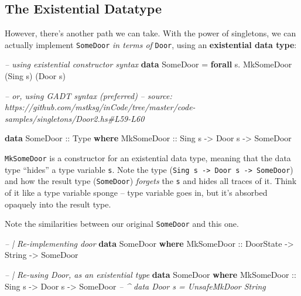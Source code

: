 \documentclass[]{article}
\newenvironment{Shaded}{}{}
\newcommand{\CommentTok}[1]{\textcolor[rgb]{0.38,0.63,0.69}{\textit{#1}}}
\newcommand{\DataTypeTok}[1]{\textcolor[rgb]{0.56,0.13,0.00}{#1}}
\newcommand{\KeywordTok}[1]{\textcolor[rgb]{0.00,0.44,0.13}{\textbf{#1}}}
\newcommand{\NormalTok}[1]{#1}
\newcommand{\OperatorTok}[1]{\textcolor[rgb]{0.40,0.40,0.40}{#1}}
\newcommand{\OtherTok}[1]{\textcolor[rgb]{0.00,0.44,0.13}{#1}}
\begin{document}
\hypertarget{the-existential-datatype}{%
\subsection{The Existential Datatype}\label{the-existential-datatype}}

However, there's another path we can take. With the power of singletons, we can
actually implement \texttt{SomeDoor} \emph{in terms of} \texttt{Door}, using an
\textbf{existential data type}:

\begin{Shaded}
\begin{Highlighting}[]
\CommentTok{-- using existential constructor syntax}
\KeywordTok{data} \DataTypeTok{SomeDoor} \OtherTok{=} \KeywordTok{forall}\NormalTok{ s}\OperatorTok{.} \DataTypeTok{MkSomeDoor}\NormalTok{ (}\DataTypeTok{Sing}\NormalTok{ s) (}\DataTypeTok{Door}\NormalTok{ s)}

\CommentTok{-- or, using GADT syntax (preferred)}
\CommentTok{-- source: https://github.com/mstksg/inCode/tree/master/code-samples/singletons/Door2.hs#L59-L60}

\KeywordTok{data} \DataTypeTok{SomeDoor}\OtherTok{ ::} \DataTypeTok{Type} \KeywordTok{where}
    \DataTypeTok{MkSomeDoor}\OtherTok{ ::} \DataTypeTok{Sing}\NormalTok{ s }\OtherTok{->} \DataTypeTok{Door}\NormalTok{ s }\OtherTok{->} \DataTypeTok{SomeDoor}
\end{Highlighting}
\end{Shaded}

\texttt{MkSomeDoor} is a constructor for an existential data type, meaning that
the data type ``hides'' a type variable \texttt{s}. Note the type
(\texttt{Sing\ s\ -\textgreater{}\ Door\ s\ -\textgreater{}\ SomeDoor}) and how
the result type (\texttt{SomeDoor}) \emph{forgets} the \texttt{s} and hides all
traces of it. Think of it like a type variable sponge -- type variable goes in,
but it's absorbed opaquely into the result type.

Note the similarities between our original \texttt{SomeDoor} and this one.

\begin{Shaded}
\begin{Highlighting}[]
\CommentTok{-- | Re-implementing door}
\KeywordTok{data} \DataTypeTok{SomeDoor} \KeywordTok{where}
    \DataTypeTok{MkSomeDoor}\OtherTok{ ::} \DataTypeTok{DoorState} \OtherTok{->} \DataTypeTok{String} \OtherTok{->} \DataTypeTok{SomeDoor}

\CommentTok{-- | Re-using Door, as an existential type}
\KeywordTok{data} \DataTypeTok{SomeDoor} \KeywordTok{where}
    \DataTypeTok{MkSomeDoor}\OtherTok{  ::} \DataTypeTok{Sing}\NormalTok{ s  }\OtherTok{->} \DataTypeTok{Door}\NormalTok{ s }\OtherTok{->} \DataTypeTok{SomeDoor}
                            \CommentTok{-- ^ data Door s = UnsafeMkDoor String}
\end{Highlighting}
\end{Shaded}
\end{document}

